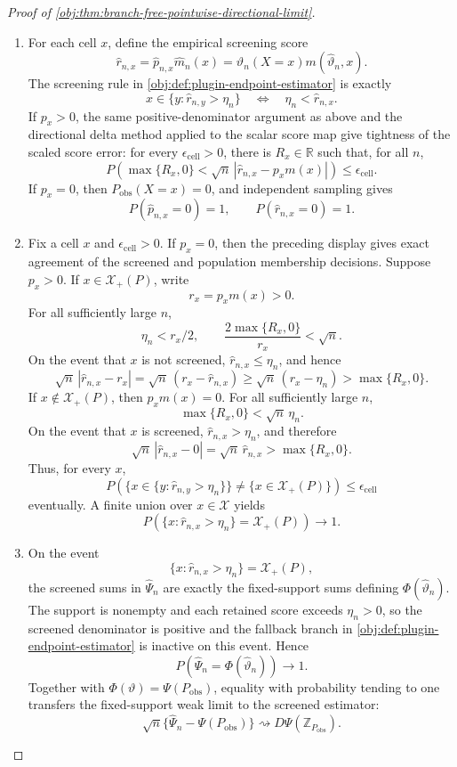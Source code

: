 \documentclass[11pt]{article}
\begin{document}
\begin{proof}[Proof of \cref{obj:thm:branch-free-pointwise-directional-limit}]
\begin{enumerate}
\item For each cell \(x\), define the empirical screening score
\[
\widehat r_{n,x}
=
\widehat p_{n,x}\widehat m_n(x)
=
\widehat\vartheta_n(X=x)m(\widehat\vartheta_n,x).
\]
The screening rule in \cref{obj:def:plugin-endpoint-estimator} is exactly
\[
x\in\{y:\widehat r_{n,y}>\eta_n\}
\quad\Longleftrightarrow\quad
\eta_n<\widehat r_{n,x}.
\]
If \(p_x>0\), the same positive-denominator argument as above and the directional delta method applied to the scalar score map give tightness of the scaled score error: for every \(\epsilon_{\mathrm{cell}}>0\), there is \(R_x\in\mathbb R\) such that, for all \(n\),
\[
P\!\left(
\max\{R_x,0\}
<
\sqrt n\,|\widehat r_{n,x}-p_xm(x)|
\right)
\le \epsilon_{\mathrm{cell}} .
\]
If \(p_x=0\), then \(P_{\mathrm{obs}}(X=x)=0\), and independent sampling gives
\[
P(\widehat p_{n,x}=0)=1,
\qquad
P(\widehat r_{n,x}=0)=1 .
\]

\item Fix a cell \(x\) and \(\epsilon_{\mathrm{cell}}>0\). If \(p_x=0\), then the preceding display gives exact agreement of the screened and population membership decisions. Suppose \(p_x>0\). If \(x\in\mathcal X_+(P)\), write
\[
r_x=p_xm(x)>0 .
\]
For all sufficiently large \(n\),
\[
\eta_n<r_x/2,
\qquad
\frac{2\max\{R_x,0\}}{r_x}<\sqrt n .
\]
On the event that \(x\) is not screened, \(\widehat r_{n,x}\le\eta_n\), and hence
\[
\sqrt n\,|\widehat r_{n,x}-r_x|
=
\sqrt n\,(r_x-\widehat r_{n,x})
\ge
\sqrt n\,(r_x-\eta_n)
>
\max\{R_x,0\}.
\]
If \(x\notin\mathcal X_+(P)\), then \(p_xm(x)=0\). For all sufficiently large \(n\),
\[
\max\{R_x,0\}<\sqrt n\,\eta_n .
\]
On the event that \(x\) is screened, \(\widehat r_{n,x}>\eta_n\), and therefore
\[
\sqrt n\,|\widehat r_{n,x}-0|
=
\sqrt n\,\widehat r_{n,x}
>
\max\{R_x,0\}.
\]
Thus, for every \(x\),
\[
P\!\left(
\{x\in\{y:\widehat r_{n,y}>\eta_n\}\}
\ne
\{x\in\mathcal X_+(P)\}
\right)
\le \epsilon_{\mathrm{cell}}
\]
eventually. A finite union over \(x\in\mathcal X\) yields
\[
P\!\left(\{x:\widehat r_{n,x}>\eta_n\}=\mathcal X_+(P)\right)\to1.
\]

\item On the event
\[
\{x:\widehat r_{n,x}>\eta_n\}=\mathcal X_+(P),
\]
the screened sums in \(\widehat\Psi_n\) are exactly the fixed-support sums defining \(\Phi(\widehat\vartheta_n)\). The support is nonempty and each retained score exceeds \(\eta_n>0\), so the screened denominator is positive and the fallback branch in \cref{obj:def:plugin-endpoint-estimator} is inactive on this event. Hence
\[
P\!\left(
\widehat\Psi_n=\Phi(\widehat\vartheta_n)
\right)\to1 .
\]
Together with \(\Phi(\vartheta)=\Psi(P_{\mathrm{obs}})\), equality with probability tending to one transfers the fixed-support weak limit to the screened estimator:
\[
\sqrt n\{\widehat\Psi_n-\Psi(P_{\mathrm{obs}})\}
\rightsquigarrow
D\Psi(\mathbb Z_{P_{\mathrm{obs}}}).
\]


\end{enumerate}
\end{proof}
\end{document}
